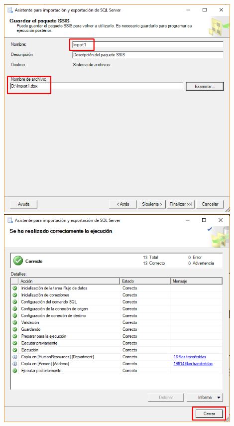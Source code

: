 \documentclass[12pt,letterpaper]{article}
\begin{document}
\begin{itemize}
\begin{center}
	\includegraphics[width=12cm]{./Imagenes/4}
	\includegraphics[width=12cm]{./Imagenes/5}
	\end{center}
\end{itemize}
\end{document}
